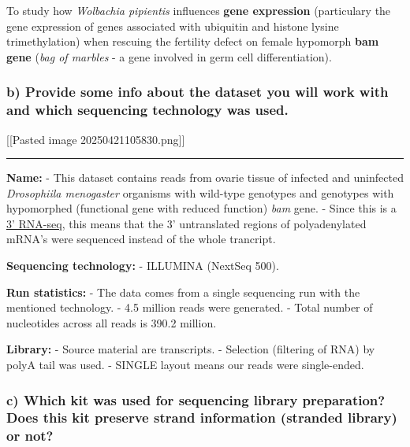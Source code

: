 To study how \emph{Wolbachia pipientis} influences \textbf{gene
expression} (particulary the gene expression of genes associated with
ubiquitin and histone lysine trimethylation) when rescuing the fertility
defect on female hypomorph \textbf{bam gene} (\emph{bag of marbles} - a
gene involved in germ cell differentiation).

\hypertarget{b-provide-some-info-about-the-dataset-you-will-work-with-and-which-sequencing-technology-was-used.}{%
\subsubsection{b) Provide some info about the dataset you will work with
and which sequencing technology was
used.}\label{b-provide-some-info-about-the-dataset-you-will-work-with-and-which-sequencing-technology-was-used.}}

{[}{[}Pasted image 20250421105830.png{]}{]}

\begin{center}\rule{0.5\linewidth}{0.5pt}\end{center}

\textbf{Name:} - This dataset contains reads from ovarie tissue of
infected and uninfected \emph{Drosophiila menogaster} organisms with
wild-type genotypes and genotypes with hypomorphed (functional gene with
reduced function) \emph{bam} gene. - Since this is a
\href{https://en.wikipedia.org/wiki/3\%27_mRNA-seq}{3' RNA-seq}, this
means that the 3' untranslated regions of polyadenylated mRNA's were
sequenced instead of the whole trancript.

\textbf{Sequencing technology:} - ILLUMINA (NextSeq 500).

\textbf{Run statistics:} - The data comes from a single sequencing run
with the mentioned technology. - 4.5 million reads were generated. -
Total number of nucleotides across all reads is 390.2 million.

\textbf{Library:} - Source material are transcripts. - Selection
(filtering of RNA) by polyA tail was used. - SINGLE layout means our
reads were single-ended.

\hypertarget{c-which-kit-was-used-for-sequencing-library-preparation-does-this-kit-preserve-strand-information-stranded-library-or-not}{%
\subsubsection{c) Which kit was used for sequencing library preparation?
Does this kit preserve strand information (stranded library) or
not?}\label{c-which-kit-was-used-for-sequencing-library-preparation-does-this-kit-preserve-strand-information-stranded-library-or-not}}

